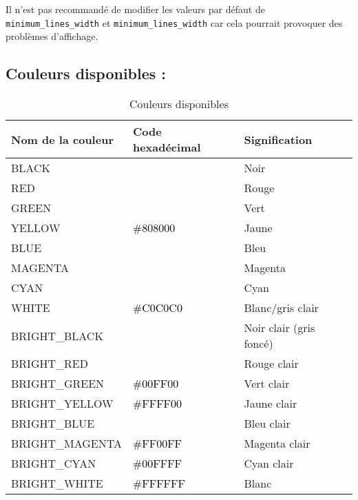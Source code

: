 \documentclass{article}
\begin{document}
Il n'est pas recommandé de modifier les valeurs par défaut de  \texttt{minimum\_lines\_width} et \texttt{minimum\_lines\_width} car cela pourrait provoquer des problèmes d'affichage.

\newpage
\subsection{Couleurs disponibles :}
\begin{table}[h!]
    \centering
    \renewcommand{\arraystretch}{1.5}
    \footnotesize
    \begin{tabular}{|>{\centering\arraybackslash}m{3.5cm}|>{\centering\arraybackslash}m{3cm}|>{\centering\arraybackslash}m{3cm}|}
        \hline
        \textbf{Nom de la couleur} & \textbf{Code hexadécimal} & \textbf{Signification} \\
        \hline
        BLACK & \cellcolor[HTML]{000000}\textcolor{white}{\#000000} & Noir \\
        \hline
        RED & \cellcolor[HTML]{800000}\textcolor{white}{\#800000} & Rouge \\
        \hline
        GREEN & \cellcolor[HTML]{008000}\textcolor{white}{\#008000} & Vert \\
        \hline
        YELLOW & \cellcolor[HTML]{808000}\textcolor{black}{\#808000} & Jaune \\
        \hline
        BLUE & \cellcolor[HTML]{000080}\textcolor{white}{\#000080} & Bleu \\
        \hline
        MAGENTA & \cellcolor[HTML]{800080}\textcolor{white}{\#800080} & Magenta \\
        \hline
        CYAN & \cellcolor[HTML]{008080}\textcolor{white}{\#008080} & Cyan \\
        \hline
        WHITE & \cellcolor[HTML]{C0C0C0}\textcolor{black}{\#C0C0C0} & Blanc/gris clair \\
        \hline
        BRIGHT\_BLACK & \cellcolor[HTML]{808080}\textcolor{white}{\#808080} & Noir clair (gris foncé) \\
        \hline
        BRIGHT\_RED & \cellcolor[HTML]{FF0000}\textcolor{white}{\#FF0000} & Rouge clair \\
        \hline
        BRIGHT\_GREEN & \cellcolor[HTML]{00FF00}\textcolor{black}{\#00FF00} & Vert clair \\
        \hline
        BRIGHT\_YELLOW & \cellcolor[HTML]{FFFF00}\textcolor{black}{\#FFFF00} & Jaune clair \\
        \hline
        BRIGHT\_BLUE & \cellcolor[HTML]{0000FF}\textcolor{white}{\#0000FF} & Bleu clair \\
        \hline
        BRIGHT\_MAGENTA & \cellcolor[HTML]{FF00FF}\textcolor{black}{\#FF00FF} & Magenta clair \\
        \hline
        BRIGHT\_CYAN & \cellcolor[HTML]{00FFFF}\textcolor{black}{\#00FFFF} & Cyan clair \\
        \hline
        BRIGHT\_WHITE & \cellcolor[HTML]{FFFFFF}\textcolor{black}{\#FFFFFF} & Blanc \\
        \hline
    \end{tabular}
    \label{tab:couleur}
    \caption{Couleurs disponibles}
\end{table}
\end{document}
